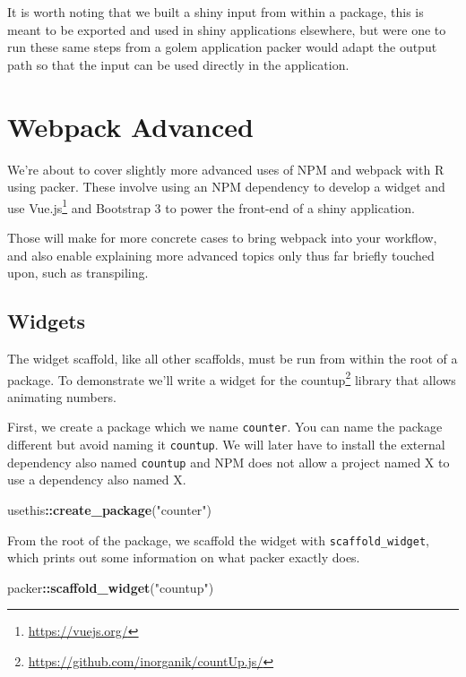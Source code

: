 \documentclass[10pt,]{krantz}
\makeatletter
\newenvironment{Shaded}{\begin{snugshade}}{\end{snugshade}}
\newcommand{\KeywordTok}[1]{\textcolor[rgb]{0.27,0.27,0.27}{\textbf{#1}}}
\newcommand{\NormalTok}[1]{#1}
\newcommand{\OperatorTok}[1]{\textcolor[rgb]{0.43,0.43,0.43}{\textbf{#1}}}
\newcommand{\StringTok}[1]{\textcolor[rgb]{0.5,0.5,0.5}{#1}}
\renewcommand{\href}[2]{#2\footnote{\url{#1}}}
\newenvironment{kframe}{%
\medskip{}
\setlength{\fboxsep}{.8em}
 \def\at@end@of@kframe{}%
 \ifinner\ifhmode%
  \def\at@end@of@kframe{\end{minipage}}%
  \begin{minipage}{\columnwidth}%
 \fi\fi%
 \def\FrameCommand##1{\hskip\@totalleftmargin \hskip-\fboxsep
 \colorbox{shadecolor}{##1}\hskip-\fboxsep
     \hskip-\linewidth \hskip-\@totalleftmargin \hskip\columnwidth}%
 \MakeFramed {\advance\hsize-\width
   \@totalleftmargin\z@ \linewidth\hsize
   \@setminipage}}%
 {\par\unskip\endMakeFramed%
 \at@end@of@kframe}
\renewenvironment{Shaded}{\begin{kframe}}{\end{kframe}}
\makeatother
\begin{document}
It is worth noting that we built a shiny input from within a package, this is meant to be exported and used in shiny applications elsewhere, but were one to run these same steps from a golem application packer would adapt the output path so that the input can be used directly in the application.

\hypertarget{packer-adv}{%
\chapter{Webpack Advanced}\label{packer-adv}}

We're about to cover slightly more advanced uses of NPM and webpack with R using packer. These involve using an NPM dependency to develop a widget and use \href{https://vuejs.org/}{Vue.js} and Bootstrap 3 to power the front-end of a shiny application.

Those will make for more concrete cases to bring webpack into your workflow, and also enable explaining more advanced topics only thus far briefly touched upon, such as transpiling.

\hypertarget{packer-adv-widgets}{%
\section{Widgets}\label{packer-adv-widgets}}

The widget scaffold, like all other scaffolds, must be run from within the root of a package. To demonstrate we'll write a widget for the \href{https://github.com/inorganik/countUp.js/}{countup} library that allows animating numbers.

First, we create a package which we name \texttt{counter}. You can name the package different but avoid naming it \texttt{countup}. We will later have to install the external dependency also named \texttt{countup} and NPM does not allow a project named X to use a dependency also named X.

\begin{Shaded}
\begin{Highlighting}[]
\NormalTok{usethis}\OperatorTok{::}\KeywordTok{create_package}\NormalTok{(}\StringTok{"counter"}\NormalTok{)}
\end{Highlighting}
\end{Shaded}

From the root of the package, we scaffold the widget with \texttt{scaffold\_widget}, which prints out some information on what packer exactly does.

\begin{Shaded}
\begin{Highlighting}[]
\NormalTok{packer}\OperatorTok{::}\KeywordTok{scaffold_widget}\NormalTok{(}\StringTok{"countup"}\NormalTok{)}
\end{Highlighting}
\end{Shaded}
\end{document}

